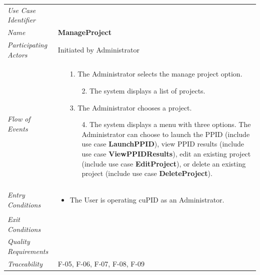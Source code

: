 \documentclass[12pt,letterpaper]{article}
\begin{document}
\begin{center}
  	  \begin{tabu} to 
		\toprule
		Use Case Identifier &  \\
		Name & {\bf ManageProject} \\
   	     Participating Actors & Initiated by Administrator \\
		Flow of Events & 
		\begin{minipage}[t]{\linewidth}
		    \begin{enumerate}
			    \item[1.] The Administrator selects the manage project option.
			    \begin{enumerate}
			        \item[2.] The system displays a list of projects.
				\end{enumerate}
				\item[3.] The Administrator chooses a project.
				\begin{enumerate}
				    \item[4.] The system displays a menu with three options. The Administrator can choose to launch the PPID (include use case \textbf{LaunchPPID}), view PPID results (include use case \textbf{ViewPPIDResults}), edit an existing project (include use case \textbf{EditProject}), or delete an existing project (include use case \textbf{DeleteProject}).
				\end{enumerate}
			\end{enumerate}
	    \end{minipage} \\

		Entry Conditions &
		\begin{minipage}[t]{\linewidth}
			\begin{itemize}
			    \item The User is operating cuPID as an Administrator.
	        \end{itemize}
	    \end{minipage} \\

		Exit Conditions & \\

		Quality Requirements & \\

		Traceability & F-05, F-06, F-07, F-08, F-09\\
        \toprule
    \end{tabu}
\end{center}
\end{document}
